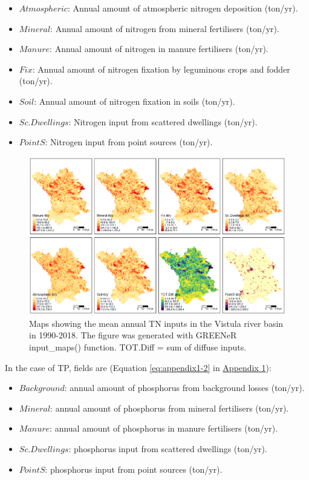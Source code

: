 \begin{itemize}
\item
  \(Atmospheric\): Annual amount of atmospheric nitrogen deposition (ton/yr).
\item
  \(Mineral\): Annual amount of nitrogen from mineral fertilisers (ton/yr).
\item
  \(Manure\): Annual amount of nitrogen in manure fertilisers (ton/yr).
\item
  \(Fix\): Annual amount of nitrogen fixation by leguminous crops and fodder (ton/yr).
\item
  \(Soil\): Annual amount of nitrogen fixation in soils (ton/yr).
\item
  \(Sc. Dwellings\): Nitrogen input from scattered dwellings (ton/yr).
\item
  \(PointS\): Nitrogen input from point sources (ton/yr).
\end{itemize}

\begin{figure}[H]
\includegraphics[width=1\linewidth,height=0.35\textheight]{figures/fig2} \caption{Maps showing the mean annual TN inputs in the Vistula river basin in 1990-2018. The figure was generated with GREENeR input\_maps() function. TOT.Diff = sum of diffuse inputs.}\label{fig:maps-TN}
\end{figure}

\noindent In the case of TP, fields are (Equation \eqref{eq:appendix1-2} in \protect\hyperlink{appendix-1}{Appendix 1}):

\begin{itemize}
\item
  \(Background\): annual amount of phosphorus from background losses (ton/yr).
\item
  \(Mineral\): annual amount of phosphorus from mineral fertilisers (ton/yr).
\item
  \(Manure\): annual amount of phosphorus in manure fertilisers (ton/yr).
\item
  \(Sc. Dwellings\): phosphorus input from scattered dwellings (ton/yr).
\item
  \(PointS\): phosphorus input from point sources (ton/yr).
\end{itemize}

